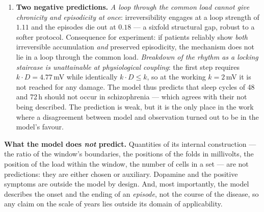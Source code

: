 \begin{enumerate}[leftmargin=1.5em,itemsep=4pt]
\item \textbf{Two negative predictions.} \emph{A loop through the common load cannot give chronicity and episodicity at once}: irreversibility engages at a loop strength of $1.11$ and the episodes die out at $0.18$ --- a sixfold structural gap, robust to a softer protocol. Consequence for experiment: if patients reliably show \emph{both} irreversible accumulation \emph{and} preserved episodicity, the mechanism does not lie in a loop through the common load. \emph{Breakdown of the rhythm as a locking staircase is unattainable at physiological coupling}: the first step requires $k\!\cdot\!D=4.77$\,mV while identically $k\!\cdot\!D\le k$, so at the working $k=2$\,mV it is not reached for any damage. The model thus predicts that sleep cycles of 48 and 72\,h should not occur in schizophrenia --- which agrees with their not being described. The prediction is weak, but it is the only place in the work where a disagreement between model and observation turned out to be in the model's favour.
\end{enumerate}

\textbf{What the model does \emph{not} predict.} Quantities of its internal construction --- the ratio of the window's boundaries, the positions of the folds in millivolts, the position of the load within the window, the number of cells in a set --- are not predictions: they are either chosen or auxiliary. Dopamine and the positive symptoms are outside the model by design. And, most importantly, the model describes the onset and the ending of an \emph{episode}, not the course of the disease, so any claim on the scale of years lies outside its domain of applicability.
